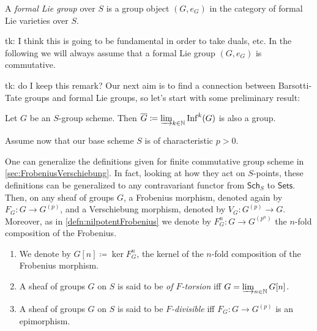 \documentclass[../Main]{subfiles}
\begin{document}
\begin{defn}
	A {\em formal Lie group} over $S$ is a group object $\left(G, e_G\right)$
	in the category of formal Lie varieties over $S$.
\end{defn}
tk: I think this is going to be fundamental in order to take duals, etc.
In the following we will always assume that a formal Lie group $\left(G, e_G\right)$
is commutative.

tk: do I keep this remark?
Our next aim is to find a connection between Barsotti-Tate groups and formal Lie groups,
so let's start with some preliminary result:
\begin{lem}
	Let $G$ be an $S$-group scheme.
	Then $\overline{G} \coloneqq \varinjlim_{k \in \mathbb{N}} \mathrm{Inf}^k(G)$
	is also a group.
\end{lem}


Assume now that our base scheme $S$ is of characteristic $p  > 0$.
\begin{rem}
One can generalize the definitions given for finite commutative group scheme
in \cref{sec:FrobeniusVerschiebung}.
In fact, looking at how they act on $S$-points, these
definitions can be generalized to any contravariant functor
from $\mathsf{Sch}_{ S }$ to $\mathsf{Sets}$.
Then, on any sheaf of groups $G$, a Frobenius morphism,
denoted again by $F_G\colon G \to G^{(p)}$, 
and a Verschiebung morphism, denoted by $V_G \colon G^{(p)} \to G$.
Moreover, as in \cref{defn:nilpotentFrobenius} we denote by
$F^n_G\colon G \to G^{(p^n)}$ the $n$-fold composition
of the Frobenius.
\end{rem}


\begin{defn}[]\leavevmode\vspace{-.2\baselineskip}
\begin{enumerate}
\item We denote by $G[n] \coloneqq \ker F^n_G$, the kernel of the $n$-fold composition
	of the Frobenius morphism.

\item A sheaf of groups $G$ on $S$ is said to be {\em of $F$-torsion} iff
	$G = \varinjlim_{n \in \mathbb{N}} G[n]$.

\item A sheaf of groups $G$ on $S$ is said to be {\em $F$-divisible} iff
	$F_G\colon G \to G^{(p)}$ is an epimorphism.
\end{enumerate}
\end{defn}
\end{document}
